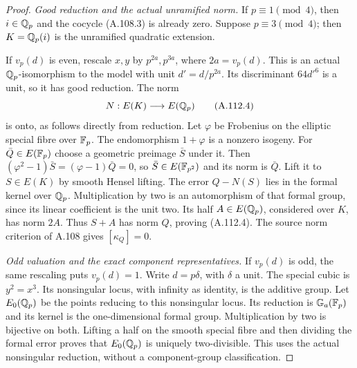 \begin{proof}
\emph{Good reduction and the actual unramified norm.}
If $p\equiv1\pmod4$, then $i\in\mathbb Q_p$ and the
cocycle (A.108.3) is already zero.
Suppose $p\equiv3\pmod4$; then
$K=\mathbb Q_p(i)$ is the unramified quadratic extension.

If $v_p(d)$ is even, rescale $x,y$ by
$p^{2a},p^{3a}$, where $2a=v_p(d)$.
This is an actual $\mathbb Q_p$-isomorphism to the model
with unit $d'=d/p^{2a}$.
Its discriminant $64d'^6$ is a unit, so it has
good reduction. The norm
\[
                 N:E(K)\longrightarrow E(\mathbb Q_p)
\tag{A.112.4}
\]
is onto, as follows directly from reduction.
Let $\varphi$ be Frobenius on the elliptic special
fibre over $\mathbb F_p$.
The endomorphism $1+\varphi$ is a nonzero isogeny.
For $\bar Q\in E(\mathbb F_p)$ choose a geometric
preimage $\bar S$ under it.
Then
$(\varphi^2-1)\bar S=(\varphi-1)\bar Q=0$,
so $\bar S\in E(\mathbb F_{p^2})$ and its norm is $\bar Q$.
Lift it to $S\in E(K)$ by smooth Hensel lifting.
The error $Q-N(S)$ lies in the formal kernel
over $\mathbb Q_p$.
Multiplication by two is an automorphism of
that formal group, since its linear coefficient
is the unit two.
Its half $A\in E(\mathbb Q_p)$, considered over $K$,
has norm $2A$.
Thus $S+A$ has norm $Q$, proving (A.112.4).
The source norm criterion of A.108 gives
$[\kappa_Q]=0$.

\emph{Odd valuation and the exact component representatives.}
If $v_p(d)$ is odd, the same rescaling puts
$v_p(d)=1$.
Write $d=p\delta$, with $\delta$ a unit.
The special cubic is $y^2=x^3$.
Its nonsingular locus, with infinity as identity,
is the additive group.
Let $E_0(\mathbb Q_p)$ be the points reducing to this
nonsingular locus.
Its reduction is $\mathbb G_a(\mathbb F_p)$ and its
kernel is the one-dimensional formal group.
Multiplication by two is bijective on both.
Lifting a half on the smooth special fibre
and then dividing the formal error proves that
$E_0(\mathbb Q_p)$ is uniquely two-divisible.
This uses the actual nonsingular reduction,
without a component-group classification.


\end{proof}
